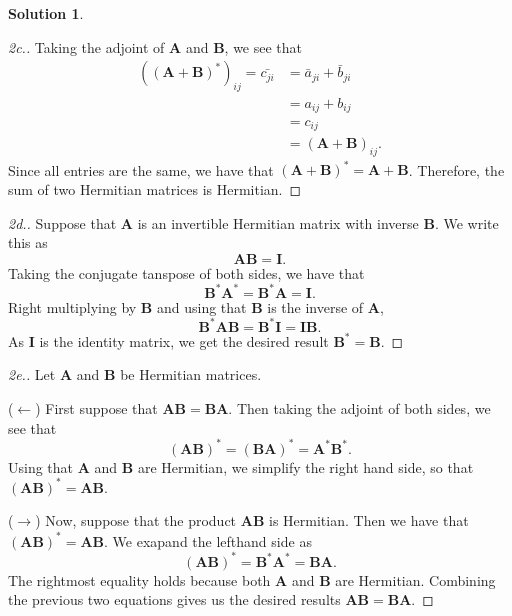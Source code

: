 \documentclass[12pt]{article}
\renewcommand{\vec}[1]{\mathbf{#1}}
\theoremstyle{definition}
\newtheorem{sol}{Solution}
\theoremstyle{remark}
\begin{document}
\begin{sol}
\begin{proof}[2c.]
Taking the adjoint of $\vec{A}$ and $\vec{B}$, we see that 
\begin{align}
    ((\vec{A}+\vec{B})^*)_{ij} = \bar{c_{ji}} &= \bar{a}_{ji} + \bar{b}_{ji}\\
                                              &= a_{ij} + b_{ij}\\
                                              &= c_{ij}\\
                                              &=  (\vec{A}+\vec{B})_{ij}.
\end{align}
Since all entries are the same, we have that $(\vec{A} + \vec{B})^* = \vec{A} + \vec{B}$. Therefore, the sum of two Hermitian matrices is Hermitian.
    \end{proof}

    \begin{proof}[2d.] Suppose that $\vec{A}$ is an invertible Hermitian matrix with inverse $\vec{B}$. We write this as
        \begin{equation}
            \vec{AB} = \vec{I}.
        \end{equation}
    Taking the conjugate tanspose of both sides, we have that
    \begin{equation}
        \vec{B}^*\vec{A}^* = \vec{B}^*\vec{A} = \vec{I}.
    \end{equation}
    Right multiplying by $\vec{B}$ and using that $\vec{B}$ is the inverse of $\vec{A}$, 
    \begin{equation} 
        \vec{B}^*\vec{A}\vec{B} = \vec{B}^* \vec{I} = \vec{I}\vec{B}.
    \end{equation}
    As $\vec{I}$ is the identity matrix, we get the desired result $\vec{B}^* = \vec{B}$.
    \end{proof}

    \begin{proof}[2e.]Let $\vec{A}$ and $\vec{B}$ be Hermitian matrices.

        ($\leftarrow$) First suppose that $\vec{AB} = \vec{BA}$. Then taking the adjoint of both sides, we see that
        \begin{equation}
            (\vec{AB})^* = (\vec{BA})^* = \vec{A}^*\vec{B}^*.
        \end{equation}
    Using that $\vec{A}$ and $\vec{B}$ are Hermitian, we simplify the right hand side, so that $(\vec{AB})^* = \vec{AB}$.

    ($\rightarrow$) Now, suppose that the product $\vec{AB}$ is Hermitian. Then we have that $(\vec{AB})^* = \vec{AB}$. We exapand the lefthand side as
    \begin{equation}
        (\vec{AB})^* = \vec{B}^*\vec{A}^* = \vec{B}\vec{A}.
    \end{equation}
    The rightmost equality holds because both $\vec{A}$ and $\vec{B}$ are Hermitian. Combining the previous two equations gives us the desired results $\vec{AB} = \vec{BA}$.
    \end{proof}
\end{sol}
\end{document}
